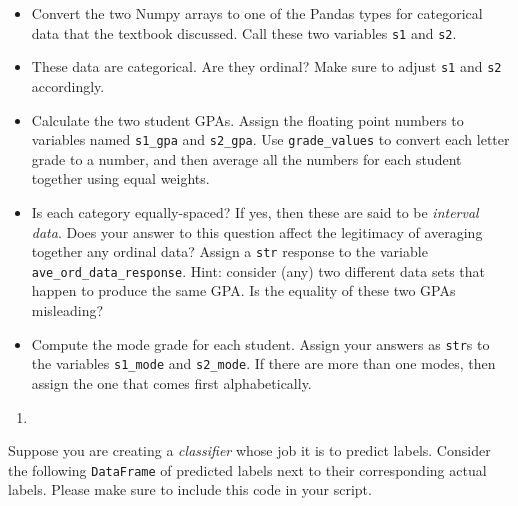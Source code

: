 \documentclass[
  12pt,
  krantz2]{krantz}
\providecommand{\tightlist}{%
  \setlength{\itemsep}{0pt}\setlength{\parskip}{0pt}}
\begin{document}
\begin{itemize}
\tightlist
\item
  Convert the two Numpy arrays to one of the Pandas types for categorical data that the textbook discussed. Call these two variables \texttt{s1} and \texttt{s2}.
\item
  These data are categorical. Are they ordinal? Make sure to adjust \texttt{s1} and \texttt{s2} accordingly.
\item
  Calculate the two student GPAs. Assign the floating point numbers to variables named \texttt{s1\_gpa} and \texttt{s2\_gpa}. Use \texttt{grade\_values} to convert each letter grade to a number, and then average all the numbers for each student together using equal weights.
\item
  Is each category equally-spaced? If yes, then these are said to be \emph{interval data}. Does your answer to this question affect the legitimacy of averaging together any ordinal data? Assign a \texttt{str} response to the variable \texttt{ave\_ord\_data\_response}. Hint: consider (any) two different data sets that happen to produce the same GPA. Is the equality of these two GPAs misleading?
\item
  Compute the mode grade for each student. Assign your answers as \texttt{str}s to the variables \texttt{s1\_mode} and \texttt{s2\_mode}. If there are more than one modes, then assign the one that comes first alphabetically.
\end{itemize}

\begin{enumerate}
\def\labelenumi{\arabic{enumi}.}
\setcounter{enumi}{1}
\tightlist
\item
\end{enumerate}

Suppose you are creating a \emph{classifier} whose job it is to predict labels. Consider the following \texttt{DataFrame} of predicted labels next to their corresponding actual labels. Please make sure to include this code in your script.
\end{document}
